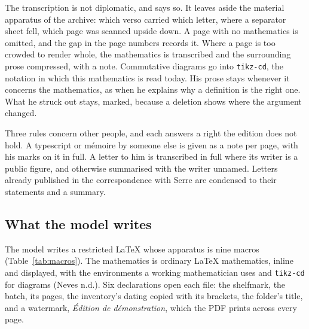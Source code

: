 \documentclass[11pt]{article}
\begin{document}
The transcription is not diplomatic, and says so. It leaves aside the material apparatus of the archive: which verso carried which letter, where a separator sheet fell, which page was scanned upside down. A page with no mathematics is omitted, and the gap in the page numbers records it. Where a page is too crowded to render whole, the mathematics is transcribed and the surrounding prose compressed, with a note. Commutative diagrams go into \texttt{tikz-cd}, the notation in which this mathematics is read today. His prose stays whenever it concerns the mathematics, as when he explains why a definition is the right one. What he struck out stays, marked, because a deletion shows where the argument changed.

Three rules concern other people, and each answers a right the edition does not hold. A typescript or mémoire by someone else is given as a note per page, with his marks on it in full. A letter to him is transcribed in full where its writer is a public figure, and otherwise summarised with the writer unnamed. Letters already published in the correspondence with Serre are condensed to their statements and a summary.

\subsection{What the model writes}

The model writes a restricted LaTeX whose apparatus is nine macros (Table~\ref{tab:macros}). The mathematics is ordinary LaTeX mathematics, inline and displayed, with the environments a working mathematician uses and \texttt{tikz-cd} for diagrams (Neves n.d.). Six declarations open each file: the shelfmark, the batch, its pages, the inventory's dating copied with its brackets, the folder's title, and a watermark, \emph{Édition de démonstration}, which the PDF prints across every page.
\end{document}
